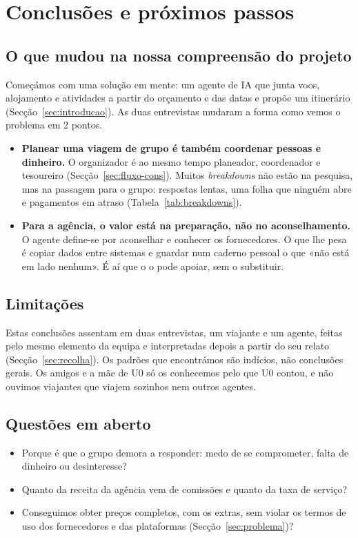 \section{Conclusões e próximos passos}\label{sec:conclusao}

\subsection{O que mudou na nossa compreensão do projeto}

Começámos com uma solução em mente: um agente de IA que junta voos, alojamento e atividades a partir do orçamento e das datas
e propõe um itinerário (Secção~\ref{sec:introducao}). As duas entrevistas mudaram a forma como vemos o problema em 2 pontos.

\begin{itemize}
  \item \textbf{Planear uma viagem de grupo é também coordenar pessoas e dinheiro.} O organizador é ao mesmo tempo planeador,
        coordenador e tesoureiro (Secção~\ref{sec:fluxo-cons}). Muitos \textit{breakdowns} não estão na pesquisa, mas na
        passagem para o grupo: respostas lentas, uma folha que ninguém abre e pagamentos em atraso (Tabela~\ref{tab:breakdowns}).
  \item \textbf{Para a agência, o valor está na preparação, não no aconselhamento.} O agente define-se por aconselhar e conhecer
        os fornecedores. O que lhe pesa é copiar dados entre sistemas e guardar num caderno pessoal o que «não está em lado
        nenhum». É aí que o \projeto{} o pode apoiar, sem o substituir.
\end{itemize}

\subsection{Limitações}

Estas conclusões assentam em duas entrevistas, um viajante e um agente, feitas pelo mesmo elemento da equipa e interpretadas
depois a partir do seu relato (Secção~\ref{sec:recolha}). Os padrões que encontrámos são indícios, não conclusões gerais.
Os amigos e a mãe de U0 só os conhecemos pelo que U0 contou, e não ouvimos viajantes que viajem sozinhos nem outros agentes.

\subsection{Questões em aberto}

\begin{itemize}
  \item Porque é que o grupo demora a responder: medo de se comprometer, falta de dinheiro ou desinteresse? 
  \item Quanto da receita da agência vem de comissões e quanto da taxa de serviço?
  \item Conseguimos obter preços completos, com os extras, sem violar os termos de uso dos fornecedores e das plataformas
        (Secção~\ref{sec:problema})?
\end{itemize}

